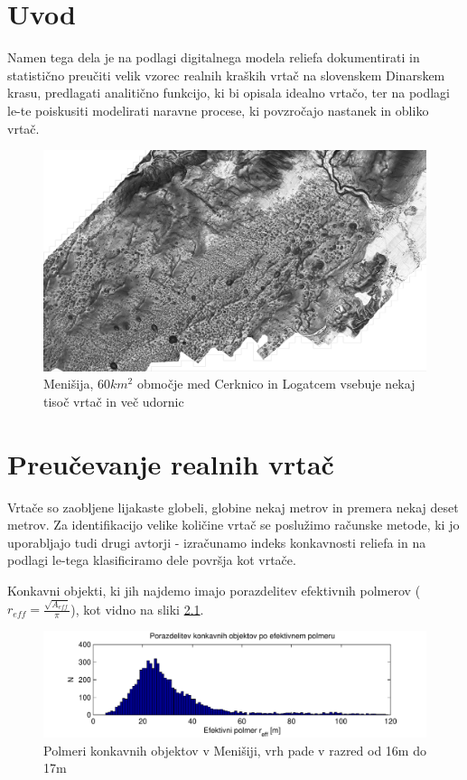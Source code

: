 \documentclass[a4paper, oneside, 12pt]{book}
\begin{document}
\mainmatter
\setcounter{page}{1}
\pagestyle{fancy}

\chapter{Uvod}
\label{ch1}
Namen tega dela je na podlagi digitalnega modela reliefa dokumentirati in statistično preučiti velik vzorec realnih kraških vrtač na slovenskem Dinarskem krasu, predlagati analitično funkcijo, ki bi opisala idealno vrtačo, ter na podlagi le-te poiskusiti modelirati naravne procese, ki povzročajo nastanek in obliko vrtač.

\begin{figure}[H]
  \centering
  \includegraphics[width=14cm]{slike/menisija-relief.png}
  \caption{Menišija, $60 km^2$ območje med Cerknico in Logatcem vsebuje nekaj tisoč vrtač in več udornic}
  \label{fig:menisija-relief}
\end{figure}

\chapter{Preučevanje realnih vrtač}

Vrtače so zaobljene lijakaste globeli, globine nekaj metrov in premera nekaj deset metrov. Za identifikacijo velike količine vrtač se poslužimo računske metode, ki jo uporabljajo tudi drugi avtorji \cite{doctor13} - izračunamo indeks konkavnosti reliefa in na podlagi le-tega klasificiramo dele površja kot vrtače.

Konkavni objekti, ki jih najdemo imajo porazdelitev efektivnih polmerov (\mbox{$r_{eff}=\frac{\sqrt{A_{eff}}}{\pi}$}), kot vidno na sliki \ref{fig:menisija-polmeri-hist}.

\begin{figure}[H]
  \centering
  \includegraphics{slike/menisija-polmeri-hist}
  \caption{Polmeri konkavnih objektov v Menišiji, vrh pade v razred od 16m do 17m}
  \label{fig:menisija-polmeri-hist}
\end{figure}
\end{document}
